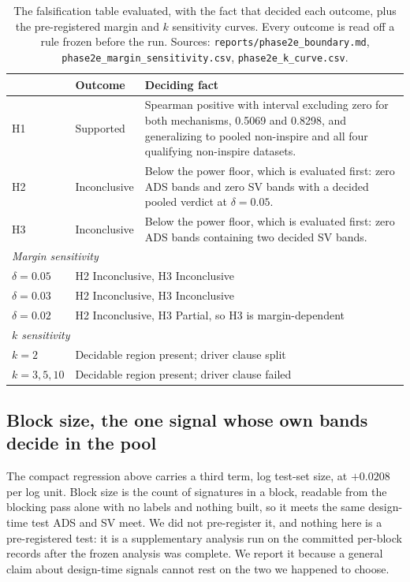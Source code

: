 \documentclass[11pt]{article}
\begin{document}
\begin{table}[htbp]
\centering
\caption{The falsification table evaluated, with the fact that decided each
outcome, plus the pre-registered margin and $k$ sensitivity curves. Every
outcome is read off a rule frozen before the run. Sources:
\texttt{reports/phase2e\_boundary.md},
\texttt{phase2e\_margin\_sensitivity.csv}, \texttt{phase2e\_k\_curve.csv}.}
\label{tab:falsification}
\small
\begin{tabular}{llp{7.4cm}}
\toprule
& Outcome & Deciding fact \\
\midrule
H1 & Supported & Spearman positive with interval excluding zero for both
mechanisms, 0.5069 and 0.8298, and generalizing to pooled non-inspire and all
four qualifying non-inspire datasets. \\
H2 & Inconclusive & Below the power floor, which is evaluated first: zero ADS bands and
zero SV bands with a decided pooled verdict at $\delta = 0.05$. \\
H3 & Inconclusive & Below the power floor, which is evaluated first: zero ADS bands
containing two decided SV bands. \\
\midrule
\multicolumn{3}{l}{\emph{Margin sensitivity}} \\
$\delta = 0.05$ & \multicolumn{2}{l}{H2 Inconclusive, H3 Inconclusive} \\
$\delta = 0.03$ & \multicolumn{2}{l}{H2 Inconclusive, H3 Inconclusive} \\
$\delta = 0.02$ & \multicolumn{2}{l}{H2 Inconclusive, H3 Partial, so H3 is margin-dependent} \\
\midrule
\multicolumn{3}{l}{\emph{$k$ sensitivity}} \\
$k = 2$ & \multicolumn{2}{l}{Decidable region present; driver clause split} \\
$k = 3, 5, 10$ & \multicolumn{2}{l}{Decidable region present; driver clause failed} \\
\bottomrule
\end{tabular}
\end{table}

\subsection{Block size, the one signal whose own bands decide in the pool}
\label{sec:blocksize}

The compact regression above carries a third term, log test-set size, at
$+0.0208$ per log unit. Block size is the count of signatures in a block,
readable from the blocking pass alone with no labels and nothing built, so it
meets the same design-time test ADS and SV meet. We did not pre-register it,
and nothing here is a pre-registered test: it is a supplementary analysis run
on the committed per-block records after the frozen analysis was complete. We
report it because a general claim about design-time signals cannot rest on the
two we happened to choose.
\end{document}
